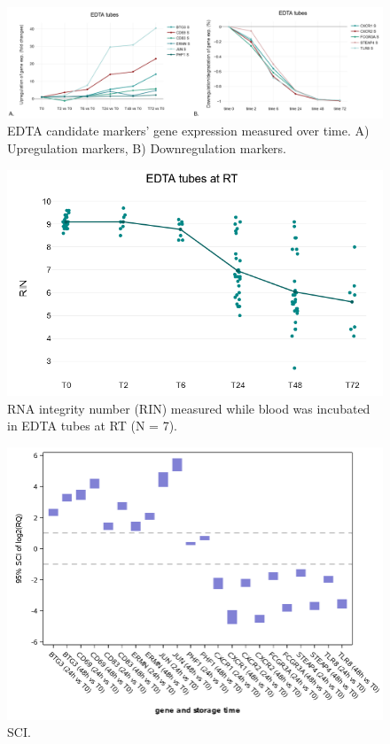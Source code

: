 \documentclass[fleqn,10pt]{wlscirep}
\begin{document}
\begin{figure}[ht]
    \centering
    \includegraphics[width=\linewidth]{figure2}
    \caption{EDTA candidate markers' gene expression measured over time. A) Upregulation markers, B) Downregulation markers.}
    \label{fig:figure2}
    \end{figure}

\begin{figure}[ht]
    \centering
    \includegraphics[width=\linewidth]{figure3}
    \caption{RNA integrity number (RIN) measured while blood was incubated in EDTA tubes at RT (N = 7).}
    \label{fig:figure3}
    \end{figure}

\begin{figure}[ht]
    \centering
    \includegraphics[width=\linewidth]{figure4}
    \caption{SCI.}
    \label{fig:figure4}
    \end{figure}
\end{document}
